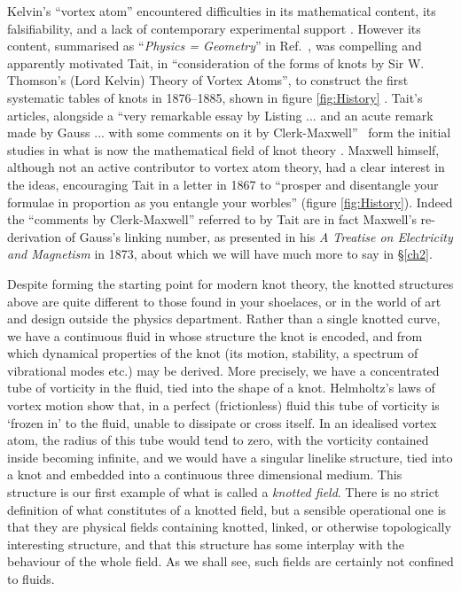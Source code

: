 Kelvin's ``vortex atom'' encountered difficulties in its mathematical content, its falsifiability, and a lack of contemporary experimental support \citep{KelvinMasters}. However its content, summarised as ``\textit{Physics = Geometry}'' in Ref.~\citep{KelvinAMS}, was compelling and apparently motivated Tait, in ``consideration of the forms of knots by Sir W. Thomson's (Lord Kelvin) Theory of Vortex Atoms'', to construct the first systematic tables of knots in 1876--1885, shown in figure \ref{fig:History} \citep{Tait1, Tait2, Tait3}. Tait's articles, alongside a ``very remarkable essay by Listing ... and an acute remark made by Gauss ... with some comments on it by Clerk-Maxwell''~\citep{Tait1} form the initial studies in what is now the mathematical field of knot theory \citep{Lickorish1997}. Maxwell himself, although not an active contributor to vortex atom theory, had a clear interest in the ideas, encouraging Tait in a letter in 1867 to ``prosper and disentangle your formulae in proportion as you entangle your worbles'' (figure \ref{fig:History}). Indeed the ``comments by Clerk-Maxwell'' referred to by Tait are in fact Maxwell's re-derivation of Gauss's linking number, as presented in his \textit{A Treatise on Electricity and Magnetism} \citep{Maxwell2} in 1873, about which we will have much more to say in \S\ref{ch2}. 

Despite forming the starting point for modern knot theory, the knotted structures above are quite different to those found in your shoelaces, or in the world of art and design outside the physics department. Rather than a single knotted curve, we have a continuous fluid in whose structure the knot is encoded, and from which dynamical properties of the knot (its motion, stability, a spectrum of vibrational modes etc.) may be derived. More precisely, we have a concentrated tube of vorticity in the fluid, tied into the shape of a knot. Helmholtz's laws of vortex motion \citep{Helmholtz} show that, in a perfect (frictionless) fluid this tube of vorticity is `frozen in' to the fluid, unable to dissipate or cross itself. In an idealised vortex atom, the radius of this tube would tend to zero, with the vorticity contained inside becoming infinite, and we would have a singular linelike structure, tied into a knot and embedded into a continuous three dimensional medium. This structure is our first example of what is called a \emph{knotted field}. There is no strict definition of what constitutes of a knotted field, but a sensible operational one is that they are physical fields containing knotted, linked, or otherwise topologically interesting structure, and that this structure has some interplay with the behaviour of the whole field. As we shall see, such fields are certainly not confined to fluids.

